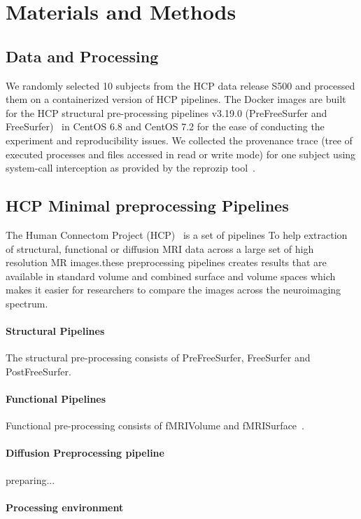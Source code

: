 \documentclass{article}
\begin{document}
\section{Materials and Methods}

\subsection{Data and Processing}

We randomly selected 10 subjects from the HCP data release S500 and processed them on a 
containerized version of HCP pipelines. The Docker images are built for the HCP structural 
pre-processing pipelines v3.19.0 (PreFreeSurfer and FreeSurfer)~\cite{Glasser2013} 
in CentOS 6.8 and CentOS 7.2 for the ease of conducting the experiment and reproducibility issues. 
We collected the provenance trace (tree of executed processes and files accessed in read or write mode) 
for one subject using system-call interception as provided by the reprozip tool~\cite{5}.

\subsection{HCP Minimal preprocessing Pipelines}

The Human Connectom Project (HCP)~\cite{Gla13} is a set of pipelines To help extraction of structural, functional or diffusion MRI data
across a large set of high resolution MR images.these preprocessing pipelines creates results that are available in standard
volume and combined surface and volume spaces which makes it easier for researchers to compare
the images across the neuroimaging spectrum.

\paragraph{Structural Pipelines} The structural pre-processing consists of PreFreeSurfer, FreeSurfer and PostFreeSurfer. 
\paragraph{Functional Pipelines} Functional pre-processing consists of fMRIVolume and fMRISurface~\cite{FSL}. 
\paragraph{Diffusion Preprocessing pipeline} preparing...

\paragraph{Processing environment}
\end{document}
